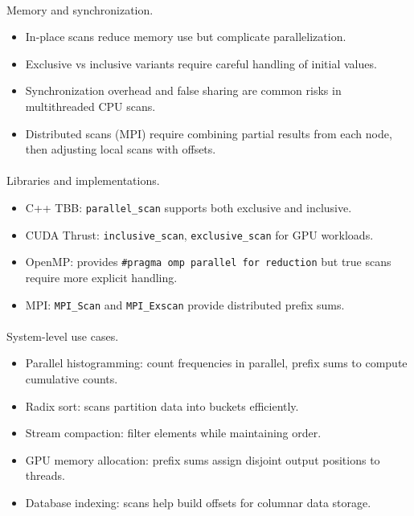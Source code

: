 \documentclass[
  letterpaper,
  DIV=11,
  numbers=noendperiod]{scrreprt}
\makeatletter
\let\oldparagraph\paragraph
\renewcommand{\paragraph}{
    \@ifstar
      \xxxParagraphStar
      \xxxParagraphNoStar
  }
\newcommand{\xxxParagraphStar}[1]{\oldparagraph*{#1}\mbox{}}
\newcommand{\xxxParagraphNoStar}[1]{\oldparagraph{#1}\mbox{}}
\providecommand{\tightlist}{%
  \setlength{\itemsep}{0pt}\setlength{\parskip}{0pt}}
\makeatother
\begin{document}
\paragraph{Memory and
synchronization.}\label{memory-and-synchronization.}

\begin{itemize}
\tightlist
\item
  In-place scans reduce memory use but complicate parallelization.
\item
  Exclusive vs inclusive variants require careful handling of initial
  values.
\item
  Synchronization overhead and false sharing are common risks in
  multithreaded CPU scans.
\item
  Distributed scans (MPI) require combining partial results from each
  node, then adjusting local scans with offsets.
\end{itemize}

\paragraph{Libraries and
implementations.}\label{libraries-and-implementations.}

\begin{itemize}
\tightlist
\item
  C++ TBB: \texttt{parallel\_scan} supports both exclusive and
  inclusive.
\item
  CUDA Thrust: \texttt{inclusive\_scan}, \texttt{exclusive\_scan} for
  GPU workloads.
\item
  OpenMP: provides \texttt{\#pragma\ omp\ parallel\ for\ reduction} but
  true scans require more explicit handling.
\item
  MPI: \texttt{MPI\_Scan} and \texttt{MPI\_Exscan} provide distributed
  prefix sums.
\end{itemize}

\paragraph{System-level use cases.}\label{system-level-use-cases.-2}

\begin{itemize}
\tightlist
\item
  Parallel histogramming: count frequencies in parallel, prefix sums to
  compute cumulative counts.
\item
  Radix sort: scans partition data into buckets efficiently.
\item
  Stream compaction: filter elements while maintaining order.
\item
  GPU memory allocation: prefix sums assign disjoint output positions to
  threads.
\item
  Database indexing: scans help build offsets for columnar data storage.
\end{itemize}
\end{document}
